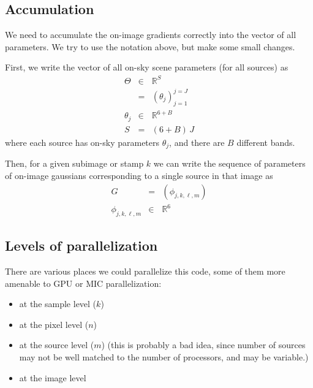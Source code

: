 \documentclass[modern]{aastex62}
\begin{document}
\subsection{Accumulation}
We need to accumulate the on-image gradients correctly into the vector of all parameters. 
We try to use the notation above, but make some small changes.

First, we write the vector of all on-sky scene parameters (for all sources) as 
\begin{eqnarray}
\Theta & \in & \mathbb{R}^{S} \\
 & = & (\theta_j)_{j=1}^{j=J} \\
\theta_j & \in & \mathbb{R}^{6+B} \\
S & = & (6 + B) \, J
\end{eqnarray}
where each source has on-sky parameters $\theta_j$, and there are $B$ different bands.

Then, for a given subimage or stamp $k$ we can write the sequence of parameters of on-image gaussians corresponding to a single source in that image as 
\begin{eqnarray}
G & = & (\phi_{j, k, \ell, m}) \\
\phi_{j, k, \ell, m} & \in & \mathbb{R}^{6}
\end{eqnarray}


\subsection{Levels of parallelization}
There are various places we could parallelize this code, 
some of them more amenable to GPU or MIC parallelization:
\begin{itemize}

\item at the sample level ($k$)

\item at the pixel level ($n$)

\item at the source level ($m$) (this is probably a bad idea, since number of sources may not be well matched to the number of processors, and may be variable.)

\item at the image level
\end{itemize}
\end{document}
